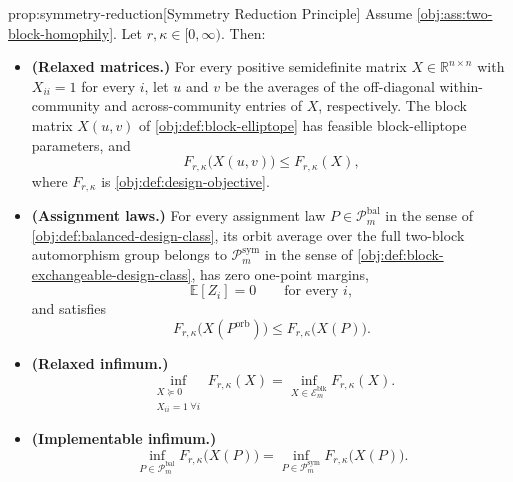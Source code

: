 \begin{propositionv}{prop:symmetry-reduction}[Symmetry Reduction Principle]
Assume \cref{obj:ass:two-block-homophily}. Let \(r,\kappa\in[0,\infty)\). Then:
\begin{itemize}
\item \textbf{(Relaxed matrices.)} For every positive semidefinite matrix \(X\in\mathbb R^{n\times n}\) with \(X_{ii}=1\) for every \(i\), let \(u\) and \(v\) be the averages of the off-diagonal within-community and across-community entries of \(X\), respectively. The block matrix \(X(u,v)\) of \cref{obj:def:block-elliptope} has feasible block-elliptope parameters, and
\[
F_{r,\kappa}\bigl(X(u,v)\bigr)\le F_{r,\kappa}(X),
\]
where \(F_{r,\kappa}\) is \cref{obj:def:design-objective}.
\item \textbf{(Assignment laws.)} For every assignment law \(P\in\mathcal P_m^{\mathrm{bal}}\) in the sense of \cref{obj:def:balanced-design-class}, its orbit average over the full two-block automorphism group belongs to \(\mathcal P_m^{\mathrm{sym}}\) in the sense of \cref{obj:def:block-exchangeable-design-class}, has zero one-point margins,
\[
\mathbb E[Z_i]=0\qquad\text{for every }i,
\]
and satisfies
\[
F_{r,\kappa}\bigl(X(P^{\mathrm{orb}})\bigr)\le F_{r,\kappa}\bigl(X(P)\bigr).
\]
\item \textbf{(Relaxed infimum.)}
\[
\inf_{\substack{X\succeq0\\ X_{ii}=1\ \forall i}} F_{r,\kappa}(X)
=
\inf_{X\in\mathcal E_m^{\mathrm{blk}}} F_{r,\kappa}(X).
\]
\item \textbf{(Implementable infimum.)}
\[
\inf_{P\in\mathcal P_m^{\mathrm{bal}}} F_{r,\kappa}\bigl(X(P)\bigr)
=
\inf_{P\in\mathcal P_m^{\mathrm{sym}}} F_{r,\kappa}\bigl(X(P)\bigr).
\]
\end{itemize}
\end{propositionv}

